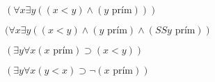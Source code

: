 $(\forall x \exists y ((x<y)\wedge(y \text{ prím})))$

$(\forall x \exists y ((x<y)\wedge(y \text{ prím})\wedge(SSy \text{ prím}))$

$(\exists y \forall x (x \text{ prím}) \supset (x<y))$

$(\exists y \forall x (y<x) \supset \neg (x \text{ prím}))$